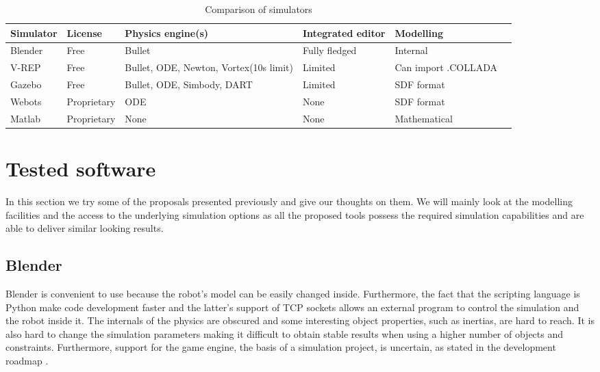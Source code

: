 \begin{table}[htp]
\center
\begin{tabularx}{\textwidth}{@{} l l X X X X @{}}
\toprule
\textbf{Simulator} & \textbf{License} & \textbf{Physics engine(s)} & \textbf{Integrated editor} & \textbf{Modelling}\\ 
\midrule
Blender & Free & Bullet & Fully fledged & Internal\\ 

V-REP & Free & Bullet, ODE, Newton, Vortex(10s limit) & Limited & Can import .COLLADA\\

Gazebo & Free & Bullet, ODE, Simbody, DART & Limited & SDF format\\

Webots & Proprietary & ODE & None & SDF format\\

Matlab & Proprietary & None & None & Mathematical\\
\bottomrule
\end{tabularx}
\caption{Comparison of simulators}
\label{table:simulators_comp}
\end{table}

\section{Tested software}
In this section we try some of the proposals presented previously and give our thoughts on them. We will mainly look at the modelling facilities and the access to the underlying simulation options as all the proposed tools possess the required simulation capabilities and are able to deliver similar looking results.

\subsection{Blender}
Blender is convenient to use because the robot's model can be easily changed inside. Furthermore, the fact that the scripting language is Python make code development faster and the latter's support of TCP sockets allows an external program to control the simulation and the robot inside it. The internals of the physics are obscured and some interesting object properties, such as inertias, are hard to reach. It is also hard to change the simulation parameters making it difficult to obtain stable results when using a higher number of objects and constraints. Furthermore, support for the game engine, the basis of a simulation project, is uncertain, as stated in the development roadmap \cite{blender_roadmap}.

